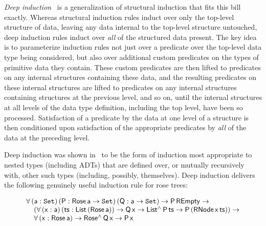 \documentclass[9pt]{entcs}
\newcommand{\set}{\mathtt{Set}}
\begin{document}
{\em Deep induction}~\cite{jp20} is a generalization of structural
induction that fits this bill exactly. Whereas structural induction
rules induct over only the top-level structure of data, leaving any
data internal to the top-level structure untouched, deep induction
rules induct over {\em all} of the structured data present. The key
idea is to parameterize induction rules not just over a predicate over
the top-level data type being considered, but also over additional
custom predicates on the types of primitive data they contain. These
custom predicates are then lifted to predicates on any internal
structures containing these data, and the resulting predicates on
these internal structures are lifted to predicates on any internal
structures containing structures at the previous level, and so on,
until the internal structures at all levels of the data type
definition, including the top level, have been so
processed. Satisfaction of a predicate by the data at one level of a
structure is then conditioned upon satisfaction of the appropriate
predicates by {\em all} of the data at the preceding level.

Deep induction was shown in~\cite{jp20} to be the form of induction
most appropriate to nested types (including ADTs) that are defined
over, or mutually recursively with, other such types (including,
possibly, themselves). Deep induction delivers the following genuinely
useful induction rule for rose trees:

\[\begin{array}{l}
\mathsf{\forall \,(a : \set)\,(P : Rose\,a \to \set)\,(Q : a \to \set)
  \to P\,REmpty \to}\\ 
\mathsf{\hspace*{0.15in}(\forall \,(x : a)\, (ts :
  List\,(Rose\,a))\to Q\,x \to List^\land\,P\,ts \to P\,(RNode\,x\,ts)) \to}\\
\mathsf{\hspace*{0.15in}\forall \,(x :
  Rose\,a) \to Rose^\land\,Q\, x \to P\,x} 
\end{array}\]
\end{document}
